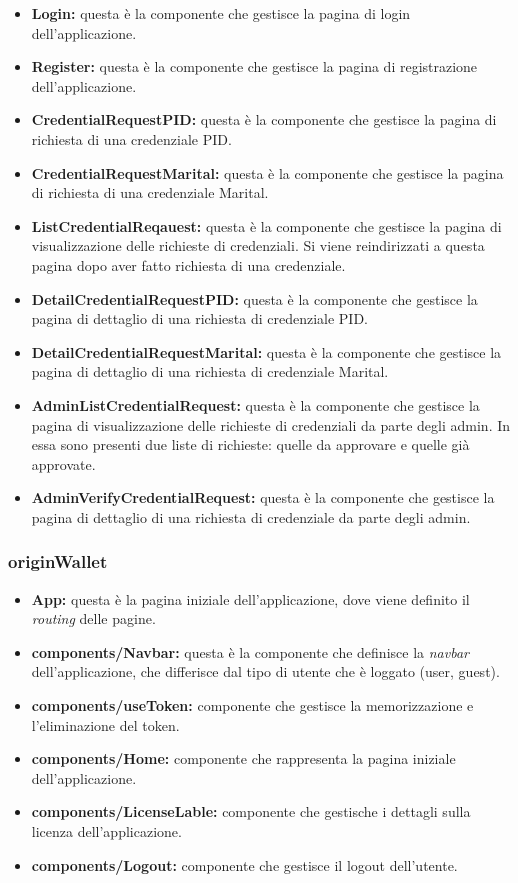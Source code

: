 \begin{itemize}
    \item \textbf{Login:} questa è la componente che gestisce la pagina di login dell'applicazione. 
    \item \textbf{Register:} questa è la componente che gestisce la pagina di registrazione dell'applicazione.
    \item \textbf{CredentialRequestPID:} questa è la componente che gestisce la pagina di richiesta di una credenziale PID.
    \item \textbf{CredentialRequestMarital:} questa è la componente che gestisce la pagina di richiesta di una credenziale Marital.
    \item \textbf{ListCredentialReqauest:} questa è la componente che gestisce la pagina di visualizzazione delle richieste di credenziali. Si viene reindirizzati
    a questa pagina dopo aver fatto richiesta di una credenziale.
    \item \textbf{DetailCredentialRequestPID:} questa è la componente che gestisce la pagina di dettaglio di una richiesta di credenziale PID.
    \item \textbf{DetailCredentialRequestMarital:} questa è la componente che gestisce la pagina di dettaglio di una richiesta di credenziale Marital.
    \item \textbf{AdminListCredentialRequest:} questa è la componente che gestisce la pagina di visualizzazione delle richieste di credenziali da parte degli admin.
    In essa sono presenti due liste di richieste: quelle da approvare e quelle già approvate.
    \item \textbf{AdminVerifyCredentialRequest:} questa è la componente che gestisce la pagina di dettaglio di una richiesta di credenziale da parte degli admin.
\end{itemize}
\subsubsection{originWallet}

\begin{itemize}
    \item \textbf{App:} questa è la pagina iniziale dell'applicazione, dove viene definito il \textit{routing} delle pagine.
    \item \textbf{components/Navbar:} questa è la componente che definisce la \textit{navbar} dell'applicazione, che differisce dal tipo di utente che è loggato (user, guest).
    \item \textbf{components/useToken:} componente che gestisce la memorizzazione e l'eliminazione del token.
    \item \textbf{components/Home:} componente che rappresenta la pagina iniziale dell'applicazione.
    \item \textbf{components/LicenseLable:} componente che gestische i dettagli sulla licenza dell'applicazione.
    \item \textbf{components/Logout:} componente che gestisce il logout dell'utente.  
\end{itemize}

